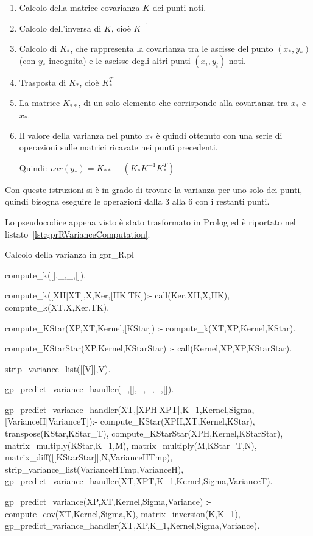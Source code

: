 \documentclass[10pt,titlepage,twoside,a4paper]{report}
\newenvironment{code}{\singlespacing\captionsetup{type=listing}}{}
\begin{document}
\begin{enumerate}
\item Calcolo della matrice covarianza $K$ dei punti noti.

\item Calcolo dell'inversa di $K$, cioè $K^{-1}$

\item Calcolo di $K_{\ast}$, che rappresenta la covarianza tra
le ascisse del punto $(x_{\ast},y_{\ast})$ (con $y_{\ast}$ incognita) e le 
ascisse degli altri punti $(x_{i},y_{i})$ noti.

\item Trasposta di $K_{\ast}$, cioè $K_{\ast}^T$

\item La matrice $K_{\ast\ast}$, di un solo elemento che 
corrisponde alla covarianza tra $x_{\ast}$ e $x_{\ast}$.

\item Il valore della varianza nel punto $x_{\ast}$ è quindi ottenuto 
con una serie di operazioni sulle matrici ricavate nei punti precedenti. 

Quindi: $var(y_{\ast}) = K_{\ast\ast} - (K_{\ast} K^{-1} K_{\ast}^T)$
\end{enumerate}

Con queste istruzioni si è in grado di trovare la varianza per uno 
solo dei punti, quindi bisogna eseguire le operazioni dalla 3 
alla 6 con i restanti punti.

Lo pseudocodice appena visto è stato trasformato in Prolog ed è riportato nel 
listato~\ref{lst:gprRVarianceComputation}.

\begin{code}
\caption{Calcolo della varianza in gpr\_R.pl}
\label{lst:gprRVarianceComputation}
\begin{prologcode*}{}
compute_k([],_,_,[]).

compute_k([XH|XT],X,Ker,[HK|TK]):-
  call(Ker,XH,X,HK),
  compute_k(XT,X,Ker,TK).

compute_KStar(XP,XT,Kernel,[KStar]) :-
    compute_k(XT,XP,Kernel,KStar).

compute_KStarStar(XP,Kernel,KStarStar) :-
    call(Kernel,XP,XP,KStarStar).

strip_variance_list([[V]],V).

gp_predict_variance_handler(_,[],_,_,_,[]).

gp_predict_variance_handler(XT,[XPH|XPT],K_1,Kernel,Sigma,[VarianceH|VarianceT]):-
    compute_KStar(XPH,XT,Kernel,KStar),
    transpose(KStar,KStar_T),
    compute_KStarStar(XPH,Kernel,KStarStar),
    matrix_multiply(KStar,K_1,M),
    matrix_multiply(M,KStar_T,N),
    matrix_diff([[KStarStar]],N,VarianceHTmp),
    strip_variance_list(VarianceHTmp,VarianceH),
    gp_predict_variance_handler(XT,XPT,K_1,Kernel,Sigma,VarianceT).

gp_predict_variance(XP,XT,Kernel,Sigma,Variance) :-
    compute_cov(XT,Kernel,Sigma,K),
    matrix_inversion(K,K_1),
    gp_predict_variance_handler(XT,XP,K_1,Kernel,Sigma,Variance).
\end{prologcode*}
\end{code}
\end{document}
